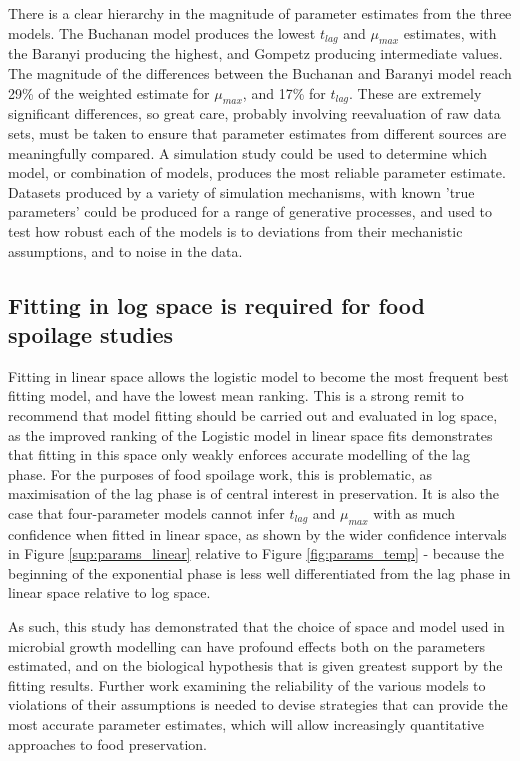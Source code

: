 \documentclass[11pt, a4paper]{article}
\begin{document}
\begin{linenumbers}
There is a clear hierarchy in the magnitude of parameter estimates from the three models. The Buchanan model produces the lowest $t_{lag}$ and $\mu_{max}$ estimates, with the Baranyi producing the highest, and Gompetz producing intermediate values. The magnitude of the differences between the Buchanan and Baranyi model reach 29\% of the weighted estimate for $\mu_{max}$, and 17\% for $t_{lag}$. These are extremely significant differences, so great care, probably involving reevaluation of raw data sets, must be taken to ensure that parameter estimates from different sources are meaningfully compared. A simulation study could be used to determine which model, or combination of models, produces the most reliable parameter estimate. Datasets produced by a variety of simulation mechanisms, with known 'true parameters' could be produced for a range of generative processes, and used to test how robust each of the models is to deviations from their mechanistic assumptions, and to noise in the data.

\subsection{Fitting in log space is required for food spoilage studies}
Fitting in linear space allows the logistic model to become the most frequent best fitting model, and have the lowest mean ranking. This is a strong remit to recommend that model fitting should be carried out and evaluated in log space, as the improved ranking of the Logistic model in linear space fits demonstrates that fitting in this space only weakly enforces accurate modelling of the lag phase. For the purposes of food spoilage work, this is problematic, as maximisation of the lag phase is of central interest in preservation. It is also the case that four-parameter models cannot infer $t_{lag}$ and $\mu_{max}$ with as much confidence when fitted in linear space, as shown by the wider confidence intervals in Figure \ref{sup:params_linear} relative to Figure \ref{fig:params_temp} - because the beginning of the exponential phase is less well differentiated from the lag phase in linear space relative to log space. 


As such, this study has demonstrated that the choice of space and model used in microbial growth modelling can have profound effects both on the parameters estimated, and on the biological hypothesis that is given greatest support by the fitting results. Further work examining the reliability of the various models to violations of their assumptions is needed to devise strategies that can provide the most accurate parameter estimates, which will allow increasingly quantitative approaches to food preservation.

\end{linenumbers}
\end{document}
